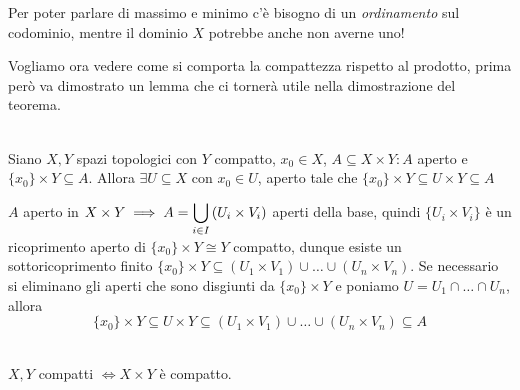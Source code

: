 \begin{observe}
	Per poter parlare di massimo e minimo c'è bisogno di un \textit{ordinamento} sul codominio, mentre il dominio $X$ potrebbe anche non averne uno!
\end{observe}
Vogliamo ora vedere come si comporta la compattezza rispetto al prodotto, prima però va dimostrato un lemma che ci tornerà utile nella dimostrazione del teorema.
\begin{lemming}~{}\\ \label{tube lemma}
	Siano $X,Y$ spazi topologici con $Y$ compatto, $x_0\in X$, $A\subseteq X\times Y\colon A$ aperto e $\{x_0\}\times Y\subseteq A$. Allora $\exists U\subseteq X$ con $x_0\in U$, aperto tale che $\{x_0\}\times Y \subseteq U\times Y \subseteq A$
\end{lemming}
\begin{demonstration}
	$A$ aperto in $\displaystyle X\times Y \implies A=\mathop{{\bigcup}}\displaylimits_{i\in I}\left( U_i\times V_i \right)$ aperti della base, quindi $\{U_i\times V_i\}$ è un ricoprimento aperto di $\{x_0\}\times Y \cong Y$ compatto, dunque esiste un sottoricoprimento finito $\{x_0\}\times Y\subseteq (U_1\times V_1)	\cup\dots\cup (U_n\times V_n)$. Se necessario si eliminano gli aperti che sono disgiunti da $\{x_0\}\times Y$ e poniamo $U=U_1\cap\dots\cap U_n$, allora
		\begin{equation*}
			\{x_0\}\times Y\subseteq U\times Y \subseteq (U_1\times V_1)	\cup\dots\cup (U_n\times V_n) \subseteq A
		\end{equation*}
\end{demonstration}
\begin{theorema}~{}\\ \label{prodotto compatti}
	$X,Y$ compatti $\iff X\times Y$ è compatto.
\end{theorema}
